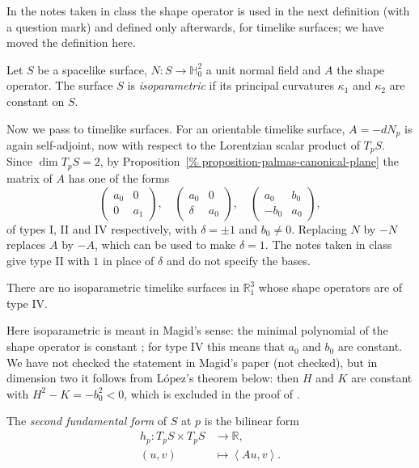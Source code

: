 In the notes taken in class the shape
operator is used in the next definition
(with a question mark) and defined only
afterwards, for timelike surfaces; we have
moved the definition here.

\begin{definition}
\label{definition-palmas-isoparametric}
Let $S$ be a spacelike surface, $N\colon
S\to\mathbb{H}^2_0$ a unit normal field
and $A$ the shape operator. The surface $S$
is \emph{isoparametric} if its principal
curvatures $\kappa_1$ and $\kappa_2$ are
constant on $S$.
\end{definition}

Now we pass to timelike surfaces. For an
orientable timelike surface, $A=-dN_p$ is
again self-adjoint, now with respect to the
Lorentzian scalar product of $T_pS$. Since
$\dim T_pS=2$, by
Proposition~\ref{%
proposition-palmas-canonical-plane}
the matrix of $A$ has one of the forms
$$
\begin{pmatrix}
a_0 & 0\\
0 & a_1
\end{pmatrix},
\quad
\begin{pmatrix}
a_0 & 0\\
\delta & a_0
\end{pmatrix},
\quad
\begin{pmatrix}
a_0 & b_0\\
-b_0 & a_0
\end{pmatrix},
$$
of types I, II and IV respectively, with
$\delta=\pm 1$ and $b_0\neq 0$. Replacing
$N$ by $-N$ replaces $A$ by $-A$, which can
be used to make $\delta=1$. The notes taken
in class give type II with $1$ in place of
$\delta$ and do not specify the bases.

\begin{theorem}[Magid, 1985]
\label{theorem-palmas-magid}
There are no isoparametric timelike
surfaces in $\mathbb{R}^3_1$ whose shape
operators are of type IV.
\end{theorem}

Here isoparametric is meant in Magid's
sense: the minimal polynomial of the shape
operator is constant
\cite{magid1985lorentzian}; for type IV
this means that $a_0$ and $b_0$ are
constant. We have not checked the
statement in Magid's paper (not checked),
but in dimension two it follows from
López's theorem below: then $H$ and $K$ are
constant with $H^2-K=-b_0^2<0$, which is
excluded in the proof of \cite[Theorem
3.3]{lopez2014differential}.

\begin{definition}
\label{definition-palmas-second-form}
The \emph{second fundamental form} of $S$
at $p$ is the bilinear form
$$
\begin{aligned}
h_p\colon T_pS\times T_pS
&\longrightarrow\mathbb{R},\\
(u,v)&\longmapsto
\left\langle{} Au,v \right\rangle{}.
\end{aligned}
$$
\end{definition}


